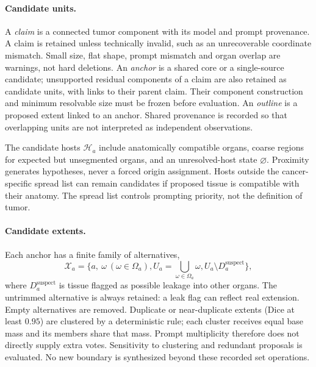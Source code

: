 \documentclass[fleqn,10pt]{olplainarticle}
\begin{document}
\paragraph{Candidate units.}
A \emph{claim} is a connected tumor component with its model and prompt provenance. A claim is retained unless technically
invalid, such as an unrecoverable coordinate mismatch. Small size, flat shape, prompt mismatch and organ overlap are
warnings, not hard deletions. An \emph{anchor} is a shared core or a single-source candidate; unsupported residual components
of a claim are also retained as candidate units, with links to their parent claim. Their component construction and minimum
resolvable size must be frozen before evaluation. An \emph{outline} is a proposed extent linked to an anchor. Shared
provenance is recorded so that overlapping units are not interpreted as independent observations.

The candidate hosts $\mathcal{H}_a$ include anatomically compatible organs, coarse regions for expected but unsegmented
organs, and an unresolved-host state $\varnothing$. Proximity generates hypotheses, never a forced origin assignment.
Hosts outside the cancer-specific spread list can remain candidates if proposed tissue is compatible with their anatomy.
The spread list controls prompting priority, not the definition of tumor.

\paragraph{Candidate extents.}
Each anchor has a finite family of alternatives,
\begin{equation}
\label{eq:extents}
\mathcal{X}_a=\{a,\ \omega\ (\omega\in\Omega_a),
U_a=\bigcup_{\omega\in\Omega_a}\omega,
U_a\setminus D_a^{\mathrm{suspect}}\},
\end{equation}
where $D_a^{\mathrm{suspect}}$ is tissue flagged as possible leakage into other organs. The untrimmed alternative is always
retained: a leak flag can reflect real extension. Empty alternatives are removed. Duplicate or near-duplicate extents
(Dice at least $0.95$) are clustered by a deterministic rule; each cluster receives equal base mass and its members share
that mass. Prompt multiplicity therefore does not directly supply extra votes. Sensitivity to clustering and redundant
proposals is evaluated. No new boundary is synthesized beyond these recorded set operations.
\end{document}
